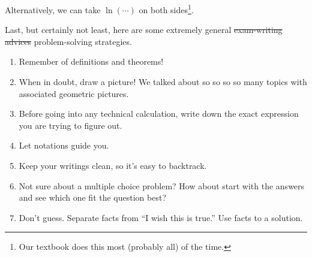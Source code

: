 \documentclass[../main.tex]{subfiles}
\begin{document}
  Alternatively, we can take \(\ln( \cdots{} )\) on both sides\footnote{Our textbook does this most (probably all) of the time.}.

  \clearpage

  Last, but certainly not least, here are some extremely general \sout{exam-writing advices} problem-solving strategies.

  \begin{enumerate}
    \item Remember  of definitions and theorems!
    \item When in doubt, draw a picture! We talked about so so so so many topics with associated geometric pictures.
    \item Before going into any technical calculation, write down the exact expression you are trying to figure out.
    \item Let notations guide you. 
    \item Keep your writings clean, so it's easy to backtrack.
    \item Not sure about a multiple choice problem? How about start with the answers and see which one fit the question best?
    \item Don't guess. Separate facts from ``I wish this is true.'' Use facts to  a solution.
  \end{enumerate}
\end{document}
